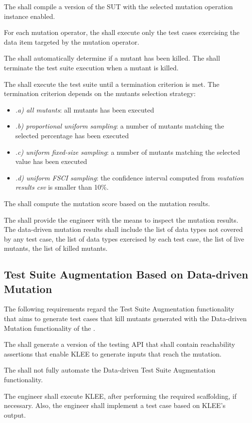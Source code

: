 \RQ{} The \FAQAS shall compile a version of the SUT with the selected mutation operation instance enabled.

\RQ{} For each mutation operator, the \FAQAS shall execute only the test cases exercising the data item targeted by the mutation operator.

\RQ{} The \FAQAS shall automatically determine if a mutant has been killed. The \FAQAS shall terminate the test suite execution when a mutant is killed.

\RQ{} The \FAQAS shall execute the test suite until a termination criterion is met. The termination criterion depends on the mutants selection strategy:
\begin{itemize}
\item \emph{.a) all mutants}: all mutants has been executed
\item \emph{.b) proportional uniform sampling}: a number of mutants matching the selected percentage has been executed
\item \emph{.c) uniform fixed-size sampling}: a number of mutants matching the selected value has been executed
\item \emph{.d) uniform FSCI sampling}: the confidence interval computed from \emph{mutation results csv} is smaller than 10\%.
\end{itemize}

\RQ{} The \FAQAS shall compute the mutation score based on the mutation results.

\RQ{} The \FAQAS shall provide the engineer with the means to inspect the mutation results. The \FAQAS data-driven mutation results shall include the list of data types not covered by any test case, the list of data types exercised by each test case, the list of live mutants, the list of killed mutants.


\subsection{Test Suite Augmentation Based on Data-driven Mutation}
\label{sec:codeDrivenAugmentation}

The following requirements regard the Test Suite Augmentation functionality that aims to generate test cases that kill mutants generated with the Data-driven Mutation functionality of the \FAQAS.

\RQ{} The \FAQAS shall generate a version of the testing API that shall contain reachability assertions that enable KLEE to generate inputs that reach the mutation.

\RQ{} The \FAQAS shall not fully automate the Data-driven Test Suite Augmentation functionality.

\remark The engineer shall execute KLEE, after performing the required scaffolding, if necessary.
Also, the engineer shall implement a test case based on KLEE's output.
